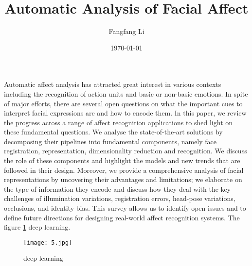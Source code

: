 \documentclass[a4paper]{article}
\begin{document}
 \title{Automatic Analysis of Facial Affect}
\author{Fangfang Li}
\date{\today}
\maketitle
 \par Automatic affect analysis has attracted great interest in various contexts including the recognition of action units and basic or non-basic emotions.\cite{higham1994bibtex} In spite of major efforts, there are several open questions on what the important cues to interpret facial expressions are and how to encode them. In this paper, we review the progress across a range of affect recognition applications to shed light on these fundamental questions. We analyse the state-of-the-art solutions by decomposing their pipelines into fundamental components, namely face registration, representation, dimensionality reduction and recognition. We discuss the role of these components and highlight the models and new trends that are followed in their design. Moreover, we provide a comprehensive analysis of facial representations by uncovering their advantages and limitations; we elaborate on the type of information they encode and discuss how they deal with the key challenges of illumination variations, registration errors, head-pose variations, occlusions, and identity bias. This survey allows us to identify open issues and to define future directions for designing real-world affect recognition systems. The figure \ref{1} {\color{red} {deep learning}}.
\begin{figure}[!htp]
\centering
\texttt{[image: 5.jpg]}
\caption{{\color{red} {deep learning}}}
\label{1}
\end{figure}
\renewcommand\refname{Reference}

\end{document}
